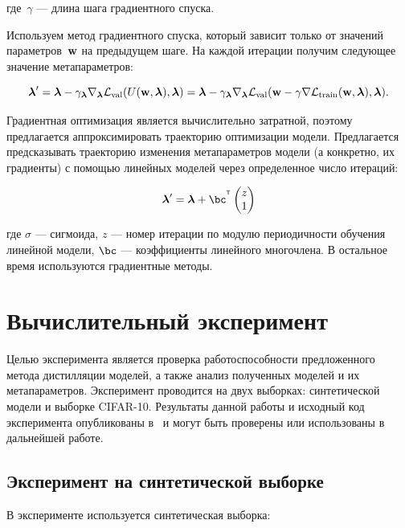 \documentclass[12pt, twoside]{article}
\begin{document}
\noindent
где~$\gamma$ — длина шага градиентного спуска.

\noindent
Используем метод градиентного спуска, который зависит только от значений параметров~$\mathbf{w}$ на предыдущем шаге. На каждой итерации получим следующее значение метапараметров:

\begin{equation} \label{eq:hyp_alg}
    \boldsymbol{\lambda}^\prime = \boldsymbol{\lambda} - \gamma_{\boldsymbol{\lambda}}\nabla_{\boldsymbol{\lambda}}\cL_\text{val}(U(\bw, \boldsymbol{\lambda}), \boldsymbol{\lambda}) = \boldsymbol{\lambda} - \gamma_{\boldsymbol{\lambda}}\nabla_{\boldsymbol{\lambda}}\cL_\text{val}(\bw - \gamma\nabla\cL_\text{train}(\bw, \boldsymbol{\lambda}), \boldsymbol{\lambda}).
\end{equation}

Градиентная оптимизация является вычислительно затратной, поэтому предлагается аппроксимировать траекторию оптимизации модели. Предлагается предсказывать траекторию изменения метапараметров модели (а конкретно, их градиенты) с помощью линейных моделей через определенное число итераций:

\begin{equation}
    \boldsymbol{\lambda}^\prime =  \boldsymbol{\lambda} + \bc^{\T}\begin{pmatrix}z\\1\end{pmatrix}
\end{equation}

\noindent
где $\sigma$ --- сигмоида, $z$ --- номер итерации по модулю периодичности обучения линейной модели, $\bc$ --- коэффициенты линейного многочлена. В остальное время используются градиентные методы.

\section{Вычислительный эксперимент}

Целью эксперимента является проверка работоспособности предложенного метода дистилляции моделей, а также анализ полученных моделей и их метапараметров. Эксперимент проводится на двух выборках: синтетической модели и выборке CIFAR-10. Результаты данной работы и исходный код эксперимента опубликованы в~\cite{distknow} и могут быть проверены или использованы в дальнейшей работе.

\subsection{Эксперимент на синтетической выборке}
В эксперименте используется синтетическая выборка:
\end{document}
